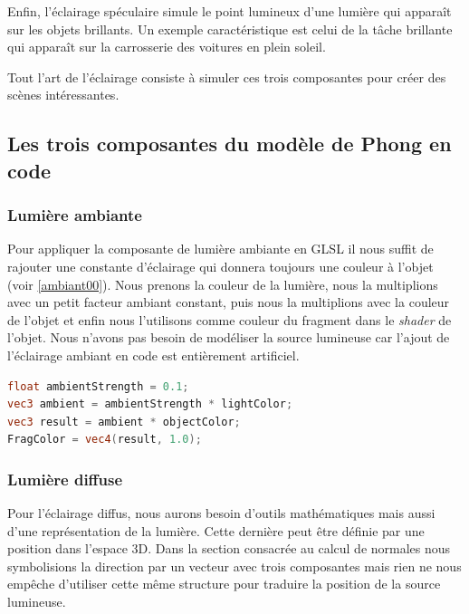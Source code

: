 Enfin, l'éclairage spéculaire simule le point lumineux d'une lumière qui apparaît sur les objets brillants. Un exemple caractéristique est celui de la tâche brillante qui apparaît sur la carrosserie des voitures en plein soleil.

Tout l'art de l'éclairage consiste à simuler ces trois composantes pour créer des scènes intéressantes.

\subsection*{Les trois composantes du modèle de Phong en code}

\subsubsection*{Lumière ambiante}
Pour appliquer la composante de lumière ambiante en GLSL il nous suffit de rajouter une constante d'éclairage qui donnera toujours une couleur à l'objet (voir \ref{ambiant00}). Nous prenons la couleur de la lumière, nous la multiplions avec un petit facteur ambiant constant, puis nous la multiplions avec la couleur de l'objet et enfin nous l'utilisons comme couleur du fragment dans le \textit{shader} de l'objet. Nous n'avons pas besoin de modéliser la source lumineuse car l'ajout de l'éclairage ambiant en code est entièrement artificiel.

\begin{minipage}{\linewidth}
\begin{lstlisting}[language=GLSL, caption=Lumière ambiante,captionpos=b,frame=single]
float ambientStrength = 0.1;
vec3 ambient = ambientStrength * lightColor;
vec3 result = ambient * objectColor;
FragColor = vec4(result, 1.0);
\end{lstlisting}
\end{minipage}

\subsubsection*{Lumière diffuse}

Pour l'éclairage diffus, nous aurons besoin d'outils mathématiques mais aussi d'une représentation de la lumière. Cette dernière peut être définie par une position dans l'espace 3D. Dans la section consacrée au calcul de normales nous symbolisions la direction par un vecteur avec trois composantes mais rien ne nous empêche d'utiliser cette même structure pour traduire la position de la source lumineuse.

